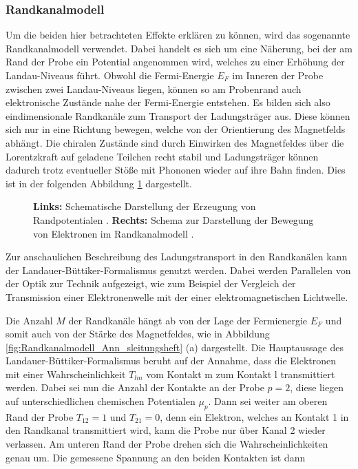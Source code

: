 \subsubsection{Randkanalmodell}

Um die beiden hier betrachteten Effekte erklären zu können, wird das sogenannte Randkanalmodell verwendet. Dabei handelt es sich um eine Näherung, bei der am Rand der Probe ein Potential angenommen wird, welches zu einer Erhöhung der Landau-Niveaus führt. Obwohl die Fermi-Energie $E_F$ im Inneren der Probe zwischen zwei Landau-Niveaus liegen, können so am Probenrand auch elektronische Zustände nahe der Fermi-Energie entstehen. Es bilden sich also eindimensionale Randkanäle zum Transport der Ladungsträger aus. Diese können sich nur in eine Richtung bewegen, welche von der Orientierung des Magnetfelds abhängt. Die chiralen Zustände sind durch Einwirken des Magnetfeldes über die Lorentzkraft auf geladene Teilchen recht stabil und Ladungsträger können dadurch trotz  eventueller Stöße mit Phononen wieder auf ihre Bahn finden. Dies ist in der folgenden Abbildung \ref{fig:Randkanalmodell_Anleitungsheft} dargestellt.

\begin{figure}[h]
	\centering
	\caption[Schema Randkanalmodell]{\textbf{Links:} Schematische Darstellung der Erzeugung von Randpotentialen \cite{anleitung}. \textbf{Rechts:} Schema zur Darstellung der Bewegung von Elektronen im Randkanalmodell \cite{anleitung}.}
	\label{fig:Randkanalmodell_Anleitungsheft}
\end{figure}

Zur anschaulichen Beschreibung des Ladungstransport in den Randkanälen kann der Landauer-Büttiker-Formalismus genutzt werden. 
Dabei werden Parallelen von der Optik zur Technik aufgezeigt, wie zum Beispiel der Vergleich der Transmission einer Elektronenwelle mit der einer elektromagnetischen Lichtwelle. 

Die Anzahl $M$ der Randkanäle hängt ab von der Lage der Fermienergie $E_F$ und somit auch von der Stärke des Magnetfeldes, wie in Abbildung \ref{fig:Randkanalmodell_Ann_sleitungsheft} (a) dargestellt.
Die Hauptaussage des Landauer-Büttiker-Formalismus beruht auf der Annahme, dass die Elektronen mit einer Wahrscheinlichkeit $T_{lm}$ vom Kontakt m zum Kontakt l transmittiert werden. Dabei sei nun die Anzahl der Kontakte an der Probe $p=2$, diese liegen auf unterschiedlichen chemischen Potentialen $\mu_p$. Dann sei weiter am oberen Rand der Probe $T_{12}=1$ und $T_{21}=0$, denn ein Elektron, welches an Kontakt 1 in den Randkanal transmittiert wird, kann die Probe nur über Kanal 2 wieder verlassen. Am unteren Rand der Probe drehen sich die Wahrscheinlichkeiten genau um.  
Die gemessene Spannung an den beiden Kontakten ist dann

